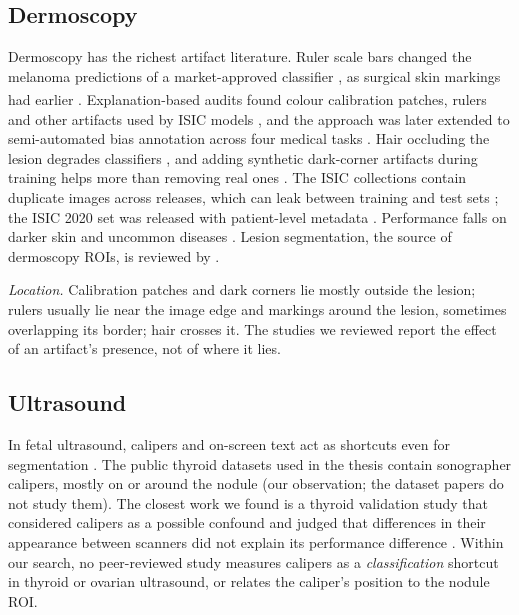 \documentclass[11pt,a4paper]{article}
\newcommand{\bg}{\textsuperscript{\dag}}
\begin{document}
\subsection{Dermoscopy}
Dermoscopy has the richest artifact literature. Ruler scale bars changed the melanoma predictions of a market-approved
classifier \citep{winkler2021scalebars}, as surgical skin markings had earlier \citep{winkler2019markings}\bg.
Explanation-based audits found colour calibration patches, rulers and other artifacts used by ISIC models
\citep{anders2022clever,pahde2023r2r}, and the approach was later extended to semi-automated bias annotation across four
medical tasks \citep{pahde2025ensuring}. Hair occluding the lesion degrades classifiers \citep{wang2024hair}, and adding
synthetic dark-corner artifacts during training helps more than removing real ones \citep{pewton2024dca}. The ISIC
collections contain duplicate images across releases, which can leak between training and test sets
\citep{cassidy2022isic}; the ISIC 2020 set
was released with patient-level metadata \citep{rotemberg2021isic2020}. Performance falls on darker skin and uncommon
diseases \citep{daneshjou2022disparities}. Lesion segmentation, the source of dermoscopy ROIs, is reviewed by
\citet{mirikharaji2023survey}.

\emph{Location.} Calibration patches and dark corners lie mostly outside the lesion; rulers usually lie near the image
edge and markings around the lesion, sometimes overlapping its border; hair crosses it. The studies we reviewed report the effect of an artifact's presence, not of where it lies.

\subsection{Ultrasound}
In fetal ultrasound, calipers and on-screen text act as shortcuts even for segmentation \citep{lin2024segshortcut}.
The public thyroid datasets used in the thesis \citep{gong2021tn3k,hou2024thyus2path} contain sonographer calipers,
mostly on or around the nodule (our observation; the dataset papers do not study them). The closest work we found is a
thyroid validation study that considered calipers as a possible confound and judged that differences in their appearance
between scanners did not explain its performance difference \citep{weng2023thyroid}. Within our search, no peer-reviewed
study measures calipers as a \emph{classification} shortcut in thyroid or ovarian ultrasound, or relates the caliper's
position to the nodule ROI.
\end{document}
